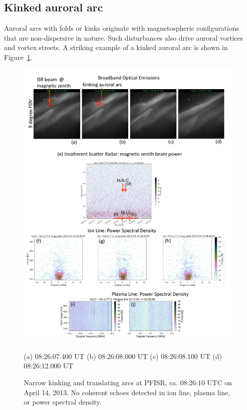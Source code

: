 \FloatBarrier
\subsection{Kinked auroral arc}\label{sec:kink}
Auroral arcs with folds or kinks originate with magnetospheric configurations that are non-dispersive in nature.
Such disturbances also drive auroral vortices and vortex streets.
A striking example of a kinked auroral arc is shown in Figure~\ref{fig:20130414T0826}.
\begin{figure}\centering
    \noindent\includegraphics[width=\columnwidth,trim=15 697 25 0,clip]{gfx/2013-04-14T0826/2013-04-14T0826}

    \hspace{1.1cm}(a) 08:26:07.400 UT 
    \hspace{1.25cm}(b) 08:26:08.000 UT
    \hspace{1.1cm}(c) 08:26:08.100 UT
    \hspace{1.1cm}(d) 08:26:12.000 UT
    
    \caption{Narrow kinking and translating arcs at PFISR, ca. 08:26:10 UTC on April 14, 2013. 
          No coherent echoes detected in ion line, plasma line, or power spectral density.}
    \label{fig:20130414T0826}
\end{figure}
